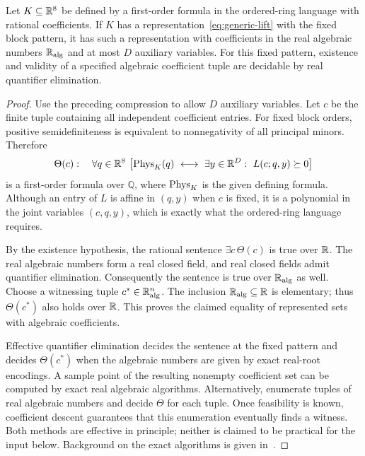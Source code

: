\begin{theorem}\label{thm:descent}
Let $K\subseteq\mathbb R^8$ be defined by a first-order formula in the ordered-ring language with rational coefficients. If $K$ has a representation~\eqref{eq:generic-lift} with the fixed block pattern, it has such a representation with coefficients in the real algebraic numbers $\mathbb R_{\mathrm{alg}}$ and at most $D$ auxiliary variables. For this fixed pattern, existence and validity of a specified algebraic coefficient tuple are decidable by real quantifier elimination.
\end{theorem}
\begin{proof}
Use the preceding compression to allow $D$ auxiliary variables. Let $c$ be the finite tuple containing all independent coefficient entries. For fixed block orders, positive semidefiniteness is equivalent to nonnegativity of all principal minors. Therefore
\begin{equation}\label{eq:theta}
 \Theta(c):\quad\forall q\in\mathbb R^8\,
 \left[\operatorname{Phys}_K(q)\ \longleftrightarrow\
       \exists y\in\mathbb R^D:\ L(c;q,y)\succeq0\right]
\end{equation}
is a first-order formula over $\mathbb Q$, where $\operatorname{Phys}_K$ is the given defining formula. Although an entry of $L$ is affine in $(q,y)$ when $c$ is fixed, it is a polynomial in the joint variables $(c,q,y)$, which is exactly what the ordered-ring language requires.

By the existence hypothesis, the rational sentence $\exists c\,\Theta(c)$ is true over $\mathbb R$. The real algebraic numbers form a real closed field, and real closed fields admit quantifier elimination. Consequently the sentence is true over $\mathbb R_{\mathrm{alg}}$ as well. Choose a witnessing tuple $c^*\in\mathbb R_{\mathrm{alg}}^n$. The inclusion $\mathbb R_{\mathrm{alg}}\subseteq\mathbb R$ is elementary; thus $\Theta(c^*)$ also holds over $\mathbb R$. This proves the claimed equality of represented sets with algebraic coefficients.

Effective quantifier elimination decides the sentence at the fixed pattern and decides $\Theta(c^*)$ when the algebraic numbers are given by exact real-root encodings. A sample point of the resulting nonempty coefficient set can be computed by exact real algebraic algorithms. Alternatively, enumerate tuples of real algebraic numbers and decide $\Theta$ for each tuple. Once feasibility is known, coefficient descent guarantees that this enumeration eventually finds a witness. Both methods are effective in principle; neither is claimed to be practical for the input below. Background on the exact algorithms is given in~\cite{Basu}.
\end{proof}

